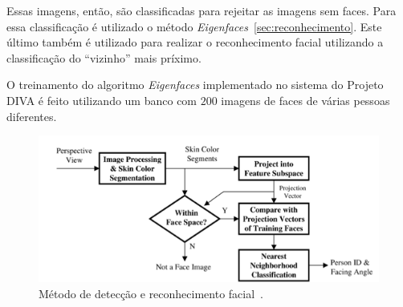 Essas imagens, então, são classificadas para rejeitar as imagens sem faces. Para essa classificação é utilizado o método \textit{Eigenfaces}~\ref{sec:reconhecimento}. Este último também é utilizado para realizar o reconhecimento facial utilizando a classificação do ``vizinho'' mais príximo.

O treinamento do algoritmo \textit{Eigenfaces} implementado no sistema do Projeto DIVA é feito utilizando um banco com $\displaystyle 200$ imagens de faces de várias pessoas diferentes.

	\begin{figure}[hbt]
		\begin{center}
			\includegraphics[scale=0.8]{figuras/3.TrabalhosCorrelatos/facerec.png}
		\end{center}
		\caption{Método de detecção e reconhecimento facial~\cite{trivedi}.}
		\label{facerec}
	\end{figure}

